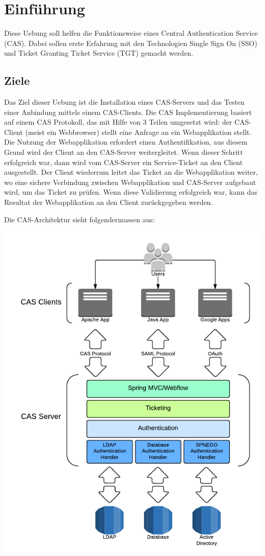 
\section{Einführung}
Diese Uebung soll helfen die Funktionsweise eines Central Authentication Service (CAS). Dabei sollen erste Erfahrung mit den Technologien Single Sign On (SSO) und Ticket Granting Ticket Service (TGT) gemacht werden.

\subsection{Ziele}
Das Ziel dieser Uebung ist die Installation eines CAS-Servers und das Testen einer Anbindung mittels einem CAS-Clients. Die CAS Implementierung basiert auf einem CAS Protokoll, das mit Hilfe von 3 Teilen umgesetzt wird: der CAS-Client (meist ein Webbrowser) stellt eine Anfrage an ein Webapplikation stellt. Die Nutzung der Webapplikation erfordert einen Authentifikation, aus diesem Grund wird der Client an den CAS-Server weitergleitet. Wenn dieser Schritt erfolgreich war, dann wird vom CAS-Server ein Service-Ticket an den Client ausgestellt. Der Client wiederrum leitet das Ticket an die Webapplikation weiter, wo eine sichere Verbindung zwischen Webapplikation und CAS-Server aufgebaut wird, um das Ticket zu prüfen. Wenn diese Validierung erfolgreich war, kann das Resultat der Webapplikation an den Client zurückgegeben werden.

Die CAS-Architektur sieht folgendermassen aus:

\begin{minipage}{\linewidth}
	\centering
	\includegraphics[width=0.59\linewidth]{images/cas_architecture}
\end{minipage}



